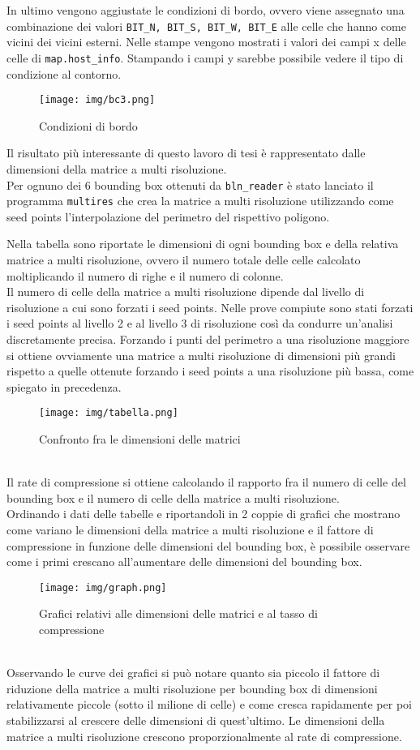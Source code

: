 	In ultimo vengono aggiustate le condizioni di bordo, ovvero viene assegnato una combinazione dei valori \texttt{BIT\_N, BIT\_S, BIT\_W, BIT\_E} alle celle che hanno come vicini dei vicini esterni. Nelle stampe vengono mostrati i valori dei campi x delle celle di \texttt{map.host\_info}. Stampando i campi y sarebbe possibile vedere il tipo di condizione al contorno.
	\begin{figure}[htbp]
		\centering
		\texttt{[image: img/bc3.png]}
		\caption{Condizioni di bordo}
	\end{figure}

	Il risultato pi\`{u} interessante di questo lavoro di tesi \`{e} rappresentato dalle dimensioni della matrice a multi risoluzione.\\
	Per ognuno dei 6 bounding box ottenuti da \texttt{bln\_reader} \`{e} stato lanciato il programma \texttt{multires} che crea la matrice a multi risoluzione utilizzando come seed points l'interpolazione del perimetro del rispettivo poligono. 

	Nella tabella sono riportate le dimensioni di ogni bounding box e della relativa matrice a multi risoluzione, ovvero il numero totale delle celle calcolato moltiplicando il numero di righe e il numero di colonne.\\
	Il numero di celle della matrice a multi risoluzione dipende dal livello di risoluzione a cui sono forzati i seed points. Nelle prove compiute sono stati forzati i seed points al livello 2 e al livello 3 di risoluzione cos\`{i} da condurre un'analisi discretamente precisa. Forzando i punti del perimetro a una risoluzione maggiore si ottiene ovviamente una matrice a multi risoluzione di dimensioni pi\`{u} grandi rispetto a quelle ottenute forzando i seed points a una risoluzione pi\`{u} bassa, come spiegato in precedenza.
	\begin{figure}[htbp]
		\centering
		\texttt{[image: img/tabella.png]}
		\caption{Confronto fra le dimensioni delle matrici}
	\end{figure} \\
	Il rate di compressione si ottiene calcolando il rapporto fra il numero di celle del bounding box e il numero di celle della matrice a multi risoluzione. \\
	Ordinando i dati delle tabelle e riportandoli in 2 coppie di grafici che mostrano come variano le dimensioni della matrice a multi risoluzione e il fattore di compressione in funzione delle dimensioni del bounding box,  \`{e} possibile osservare come i primi crescano all'aumentare delle dimensioni del bounding box.
	\begin{figure}[htbp]
		\centering
		\texttt{[image: img/graph.png]}
		\caption{Grafici relativi alle dimensioni delle matrici e al tasso di compressione}
	\end{figure}\\
	Osservando le curve dei grafici si pu\`{o} notare quanto sia piccolo il fattore di riduzione della matrice a multi risoluzione per bounding box di dimensioni relativamente piccole (sotto il milione di celle) e come cresca rapidamente per poi stabilizzarsi al crescere delle dimensioni di quest'ultimo. Le dimensioni della matrice a multi risoluzione crescono proporzionalmente al rate di compressione.
	